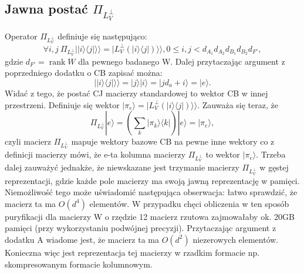 \documentclass[10pt]{article} %
\DeclareMathOperator{\Rank}{rank}
\newcommand{\Ket}[1]{|#1\rangle}
\newcommand{\Bra}[1]{\langle#1|}
\newcommand{\KKet}[1]{|#1\rangle\rangle}
\newcommand{\LPV}{{L^\perp_V}}
\begin{document}
\begin{appendices}
\section{Jawna postać $\Pi_\LPV$}
Operator $\Pi_\LPV$ definiuje się następująco:
\begin{equation}
\forall i,j~\Pi_\LPV \KKet{\Ket{i}\Bra{j}} = \KKet{\LPV(\Ket{i}\Bra{j})}, 0 \leq i,j < d_{A_1} d_{A_2} d_{B_1} d_{B_2} d_{F'},
\end{equation}
gdzie $d_{F'}=\Rank{W}$ dla pewnego badanego W.
Dalej przytaczając argument z poprzedniego dodatku o CB zapisać można:
\begin{equation}
\KKet{\Ket{i}\Bra{j}} = \Ket{j}\Ket{i} = \Ket{j d_a + i} = \Ket{e}.
\end{equation} Widać z tego, że postać CJ macierzy standardowej to wektor CB w innej przestrzeni.
Definiuje się wektor $\Ket{\pi_{e}} = \KKet{\LPV(\Ket{i}\Bra{j})}$. Zauważa się teraz, że 
\begin{equation}
\Pi_\LPV \Ket{e} = \left(\sum_k \Ket{\pi_k}\Bra{k}\right)\Ket{e} = \Ket{\pi_{e}},
\end{equation} czyli macierz $\Pi_\LPV$ mapuje wektory bazowe CB na pewne inne wektory co z definicji macierzy mówi, że e-ta kolumna macierzy $\Pi_\LPV$ to wektor $\Ket{\pi_{e}}$.
Trzeba dalej zauważyć jednakże, że niewskazane jest trzymanie macierzy $\Pi_\LPV$ w gęstej reprezentacji, gdzie każde pole macierzy ma swoją jawną reprezentację w pamięci.
Niemożliwość tego może uświadomić następująca obserwacja: łatwo sprawdzić, że macierz ta ma $O(d^4)$ elementów. W przypadku chęci obliczenia w ten sposób puryfikacji dla macierzy W o rzędzie 12 macierz rzutowa zajmowałaby ok. 20GB pamięci (przy wykorzystaniu podwójnej precyzji).
Przytaczając argument z dodatku A wiadome jest, że macierz ta ma $O(d^2)$ niezerowych elementów. Konieczna więc jest reprezentacja tej macierzy w rzadkim formacie np. skompresowanym formacie kolumnowym.
\end{appendices}

\end{document}
